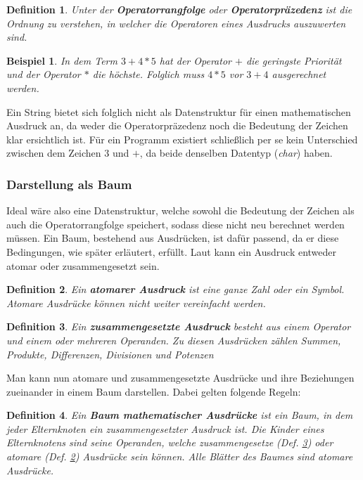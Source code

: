 \documentclass[11pt]{article}
\newtheorem{defin}{Definition}
\newcommand{\lab}[1]{(Def. \ref{#1})}
\newtheorem{example}{Beispiel}
\begin{document}
\begin{defin}
Unter der \textbf{Operatorrangfolge} oder \textbf{Operatorpräzedenz} ist die Ordnung zu verstehen, 
in welcher die Operatoren eines Ausdrucks auszuwerten sind.
\label{def:operatorrangfolge}
\end{defin}
\begin{example} \normalfont
In dem Term $3+4*5$ hat der Operator $+$ die geringste Priorität und der Operator $*$ die höchste. 
Folglich muss $4*5$ vor $3+4$ ausgerechnet werden. 
\end{example}


Ein String bietet sich folglich nicht als Datenstruktur für einen mathematischen Ausdruck 
an, da weder die Operatorpräzedenz noch die Bedeutung der Zeichen klar ersichtlich ist.
Für ein Programm existiert schließlich per se kein Unterschied zwischen dem Zeichen $3$ und $+$, 
da beide denselben Datentyp (\textit{char}) haben.

\subsubsection{Darstellung als Baum}

Ideal wäre also eine Datenstruktur, welche sowohl die Bedeutung der Zeichen als auch die Operatorrangfolge speichert,
sodass diese nicht neu berechnet werden müssen. Ein Baum, bestehend aus Ausdrücken, ist dafür passend, da er diese Bedingungen, wie später erläutert,
erfüllt.
\newline
Laut \citeauthor{CAS_EA} \cite[81]{CAS_EA} kann ein Ausdruck entweder atomar
oder zusammengesetzt sein.

\begin{defin}
Ein \textbf{atomarer Ausdruck} ist eine ganze Zahl oder ein Symbol. Atomare Ausdrücke können
nicht weiter vereinfacht werden.
\label{def:atomarer_ausdruck}
\end{defin}

\begin{defin}
Ein \textbf{zusammengesetzte Ausdruck} besteht aus einem Operator und einem oder mehreren Operanden. 
Zu diesen Ausdrücken zählen Summen, Produkte, Differenzen, Divisionen und Potenzen
\label{def:zusammengesetzter_ausdruck}
\end{defin}

Man kann nun atomare und zusammengesetzte Ausdrücke und ihre Beziehungen zueinander in einem Baum darstellen.
Dabei gelten folgende Regeln:

\begin{defin}
Ein \textbf{Baum mathematischer Ausdrücke} ist ein Baum, in dem jeder Elternknoten ein zusammengesetzter Ausdruck ist. 
Die Kinder
eines Elternknotens sind seine Operanden, welche zusammengesetze \lab{def:zusammengesetzter_ausdruck} oder atomare 
\lab{def:atomarer_ausdruck} Ausdrücke sein können. Alle Blätter des Baumes sind atomare Ausdrücke. 
\label{def:baum}
\end{defin}
\end{document}
